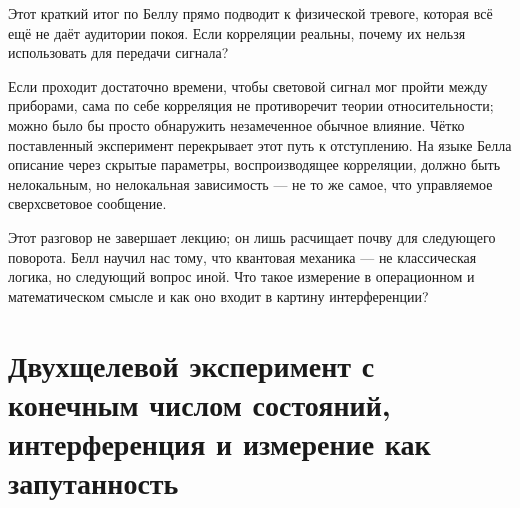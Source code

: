 Этот краткий итог по Беллу прямо подводит к физической тревоге, которая всё ещё не даёт аудитории покоя. Если корреляции реальны, почему их нельзя использовать для передачи сигнала?

\begin{classroomqa}
\end{classroomqa}

Если проходит достаточно времени, чтобы световой сигнал мог пройти между приборами, сама по себе корреляция не противоречит теории относительности; можно было бы просто обнаружить незамеченное обычное влияние. Чётко поставленный эксперимент перекрывает этот путь к отступлению. На языке Белла описание через скрытые параметры, воспроизводящее корреляции, должно быть нелокальным, но нелокальная зависимость — не то же самое, что управляемое сверхсветовое сообщение.

\begin{classroomqa}
\end{classroomqa}

Этот разговор не завершает лекцию; он лишь расчищает почву для следующего поворота. Белл научил нас тому, что квантовая механика — не классическая логика, но следующий вопрос иной. Что такое измерение в операционном и математическом смысле и как оно входит в картину интерференции?

\section{Двухщелевой эксперимент с конечным числом состояний, интерференция и измерение как запутанность}

